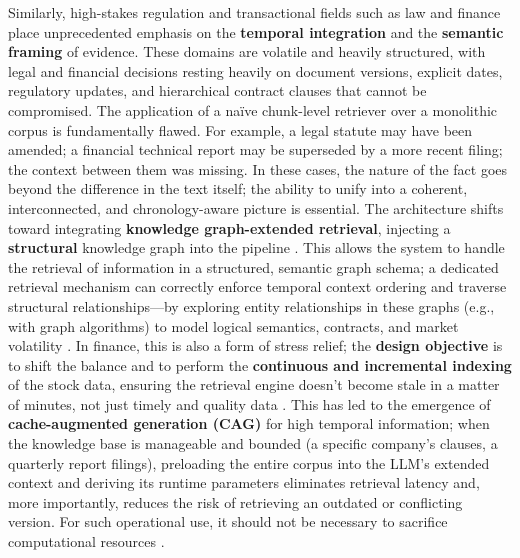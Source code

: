\documentclass[11pt,a4paper]{article}
\begin{document}
Similarly, high-stakes regulation and transactional fields such as law and finance place unprecedented emphasis on the \textbf{temporal integration} and the \textbf{semantic framing} of evidence. These domains are volatile and heavily structured, with legal and financial decisions resting heavily on document versions, explicit dates, regulatory updates, and hierarchical contract clauses that cannot be compromised. The application of a na\"{i}ve chunk-level retriever over a monolithic corpus is fundamentally flawed. For example, a legal statute may have been amended; a financial technical report may be superseded by a more recent filing; the context between them was missing. In these cases, the nature of the fact goes beyond the difference in the text itself; the ability to unify into a coherent, interconnected, and chronology-aware picture is essential. The architecture shifts toward integrating \textbf{knowledge graph-extended retrieval}, injecting a \textbf{structural} knowledge graph into the pipeline \cite{arxiv:2502.06864v1,arxiv:2502.06864v1}. This allows the system to handle the retrieval of information in a structured, semantic graph schema; a dedicated retrieval mechanism can correctly enforce temporal context ordering and traverse structural relationships---by exploring entity relationships in these graphs (e.g., with graph algorithms) to model logical semantics, contracts, and market volatility \cite{arxiv:2501.13958v3}. In finance, this is also a form of stress relief; the \textbf{design objective} is to shift the balance and to perform the \textbf{continuous and incremental indexing} of the stock data, ensuring the retrieval engine doesn't become stale in a matter of minutes, not just timely and quality data \cite{arxiv:2405.06211v3}. This has led to the emergence of \textbf{cache-augmented generation (CAG)} for high temporal information; when the knowledge base is manageable and bounded (a specific company's clauses, a quarterly report filings), preloading the entire corpus into the LLM's extended context and deriving its runtime parameters eliminates retrieval latency and, more importantly, reduces the risk of retrieving an outdated or conflicting version. For such operational use, it should not be necessary to sacrifice computational resources \cite{arxiv:2412.15605v2}.
\end{document}
